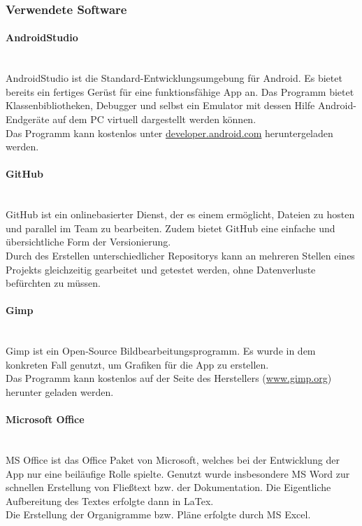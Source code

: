 \subsubsection{Verwendete Software}
\paragraph{AndroidStudio}
\ \\[1em]
AndroidStudio ist die Standard-Entwicklungsumgebung für Android. Es bietet bereits ein fertiges Gerüst für eine funktionsfähige App an. Das Programm bietet Klassenbibliotheken, Debugger und selbst ein Emulator mit dessen Hilfe Android-Endgeräte auf dem PC virtuell dargestellt werden können.\\
Das Programm kann kostenlos unter \href{https://developer.android.com/sdk/index.html}{developer.android.com} heruntergeladen werden.



\paragraph{GitHub}
\ \\[1em]
GitHub ist ein onlinebasierter Dienst, der es einem ermöglicht, Dateien zu hosten und parallel im Team zu bearbeiten. Zudem bietet GitHub eine einfache und übersichtliche Form der Versionierung.\\
Durch des Erstellen unterschiedlicher Repositorys kann an mehreren Stellen eines Projekts gleichzeitig gearbeitet und getestet werden, ohne Datenverluste befürchten zu müssen.

\paragraph{Gimp}
\ \\[1em]
Gimp ist ein Open-Source Bildbearbeitungsprogramm. Es wurde in dem konkreten Fall genutzt, um Grafiken für die App zu erstellen.\\
Das Programm kann kostenlos auf der Seite des Herstellers  (\href{http://www.gimp.org/downloads/}{www.gimp.org}) herunter geladen werden.

\paragraph{Microsoft Office}
\ \\[1em]
MS Office ist das Office Paket von Microsoft, welches bei der Entwicklung der App nur eine beiläufige Rolle spielte. Genutzt wurde insbesondere MS Word zur schnellen Erstellung von Fließtext bzw. der Dokumentation. Die Eigentliche Aufbereitung des Textes erfolgte dann in LaTex.\\
Die Erstellung der Organigramme bzw. Pläne erfolgte durch MS Excel.

